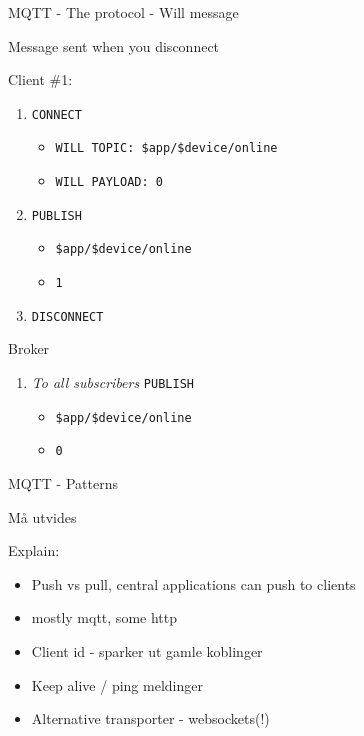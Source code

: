 \begin{frame}[fragile]{MQTT - The protocol - Will message}
\protect\hypertarget{mqtt---the-protocol---will-message}{}

Message sent when you disconnect

Client \#1:

\begin{enumerate}
[1.]
\tightlist
\item
  \texttt{CONNECT}

  \begin{itemize}
  \tightlist
  \item
    \texttt{WILL\ TOPIC:\ \$app/\$device/online}
  \item
    \texttt{WILL\ PAYLOAD:\ 0}
  \end{itemize}
\item
  \texttt{PUBLISH}

  \begin{itemize}
  \tightlist
  \item
    \texttt{\$app/\$device/online}
  \item
    \texttt{1}
  \end{itemize}
\item
  \texttt{DISCONNECT}
\end{enumerate}

Broker

\begin{enumerate}
[1.]
\tightlist
\item
  \emph{To all subscribers} \texttt{PUBLISH}

  \begin{itemize}
  \tightlist
  \item
    \texttt{\$app/\$device/online}
  \item
    \texttt{0}
  \end{itemize}
\end{enumerate}

\end{frame}

\begin{frame}{MQTT - Patterns}
\protect\hypertarget{mqtt---patterns}{}

Må utvides

Explain:

\begin{itemize}
\tightlist
\item
  Push vs pull, central applications can push to clients
\item
  mostly mqtt, some http
\item
  Client id - sparker ut gamle koblinger
\item
  Keep alive / ping meldinger
\item
  Alternative transporter - websockets(!)
\end{itemize}

\end{frame}

